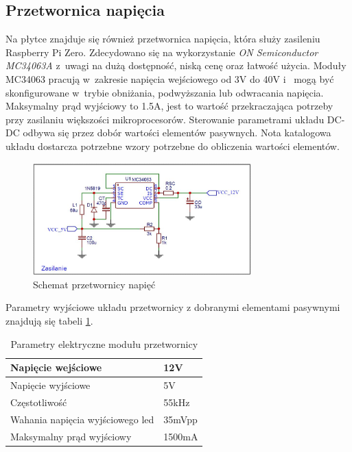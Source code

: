 \documentclass[12pt, eng, twoside, openany, final]{mgr}
\begin{document}
        \subsection{Przetwornica napięcia}
        Na płytce znajduje się również przetwornica napięcia, która służy zasileniu Raspberry Pi Zero. Zdecydowano się na wykorzystanie \emph{ON Semiconductor MC34063A} z~uwagi na dużą dostępność, niską cenę oraz łatwość użycia. Moduły MC34063 pracują w~zakresie napięcia wejściowego od 3V do 40V i~ mogą być skonfigurowane w~trybie obniżania, podwyższania lub odwracania napięcia. Maksymalny prąd wyjściowy to 1.5A, jest to wartość przekraczająca potrzeby przy zasilaniu większości mikroprocesorów. Sterowanie parametrami układu DC-DC odbywa się przez dobór wartości elementów pasywnych. Nota katalogowa\cite{mc34063A} układu dostarcza potrzebne wzory potrzebne do obliczenia wartości elementów.
                \begin{figure}[H]
                \begin{center}
                    \includegraphics[width=0.75\textwidth]{zasilanie.jpg}
                    \caption{Schemat przetwornicy napięć}
                \end{center}
                \end{figure}
                
\noindent        Parametry wyjściowe układu przetwornicy z dobranymi elementami pasywnymi znajdują się tabeli \ref{tab:przet}.
             \begin{table}[H]
        \centering
        \begin{tabular}{ | m{15em} | m{3cm}| } 
        \hline
        Napięcie wejściowe & 12V \\ 
        \hline
        Napięcie wyjściowe & 5V \\ 
        \hline
        Częstotliwość  &55kHz\\
        \hline
        Wahania napięcia wyjściowego led &35mVpp\\
        \hline
        Maksymalny prąd wyjściowy &1500mA\\
        \hline
        \end{tabular}
        \caption{Parametry elektryczne modułu przetwornicy}
        \label{tab:przet}
        \end{table}
        
\end{document}
